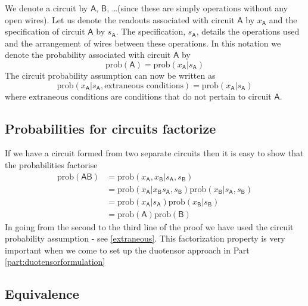 \documentclass[10pt]{article}
\begin{document}
We denote a circuit by $\mathsf{A}$, $\mathsf{B}$, \dots (since these are simply operations without any open wires).  Let us denote the readouts associated with circuit $\mathsf A$ by $x_\mathsf{A}$ and the specification of circuit $\mathsf A$ by $s_\mathsf{A}$.  The specification, $s_\mathsf{A}$, details the operations used and the arrangement of wires between these operations.  In this notation we denote the probability associated with circuit $\mathsf A$ by
\begin{equation}
\text{prob}(\mathsf{A}) = \text{prob}(x_\mathsf{A}|s_\mathsf{A})
\end{equation}
The circuit probability assumption can now be written as
\begin{equation}\label{extraneous}
\text{prob}(x_\mathsf{A}|s_\mathsf{A}, \text{extraneous conditions})= \text{prob}(x_\mathsf{A}|s_\mathsf{A})
\end{equation}
where $\text{extraneous conditions}$ are conditions that do not pertain to circuit $\mathsf A$.

\subsection{Probabilities for circuits factorize}\label{sec:circuitprobsfactorize}

If we have a circuit formed from two separate circuits then it is easy to show that the probabilities factorise
\begin{align*}
\text{prob}(\mathsf{AB}) & =  \text{prob}(x_\mathsf{A},x_\mathsf{B}|s_\mathsf{A},s_\mathsf{B})  \\
&= \text{prob}(x_\mathsf{A}|x_\mathsf{B}s_\mathsf{A},s_\mathsf{B})\text{prob}(x_\mathsf{B}|s_\mathsf{A},s_\mathsf{B}) \\
&= \text{prob}(x_\mathsf{A}|s_\mathsf{A})\text{prob}(x_\mathsf{B}|s_\mathsf{B}) \\
&= \text{prob}(\mathsf{A})\text{prob}(\mathsf{B})
\end{align*}
In going from the second to the third line of the proof we have used the circuit probability assumption - see \eqref{extraneous}.
This factorization property is very important when we come to set up the duotensor approach in Part \ref{part:duotensorformulation}

\subsection{Equivalence}\label{sec:equivalence}
\end{document}
